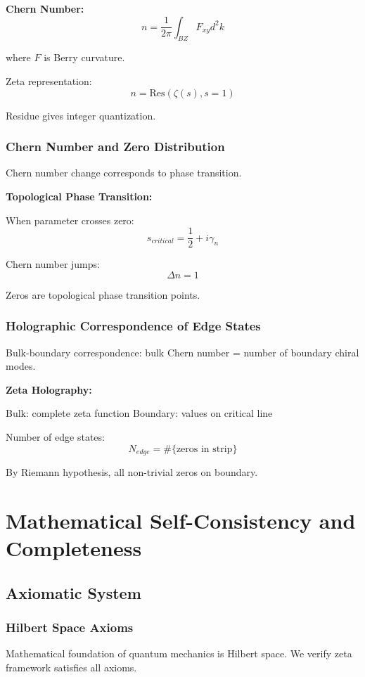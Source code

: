 \documentclass[11pt]{article}
\theoremstyle{plain}
\theoremstyle{definition}
\theoremstyle{remark}
\begin{document}
\textbf{Chern Number:}
$$n = \frac{1}{2\pi} \int_{BZ} F_{xy} d^2k$$

where $F$ is Berry curvature.

Zeta representation:
$$n = \text{Res}(\zeta(s), s = 1)$$

Residue gives integer quantization.

\subsubsection{Chern Number and Zero Distribution}

Chern number change corresponds to phase transition.

\textbf{Topological Phase Transition:}

When parameter crosses zero:
$$s_{critical} = \frac{1}{2} + i\gamma_n$$

Chern number jumps:
$$\Delta n = 1$$

Zeros are topological phase transition points.

\subsubsection{Holographic Correspondence of Edge States}

Bulk-boundary correspondence: bulk Chern number = number of boundary chiral modes.

\textbf{Zeta Holography:}

Bulk: complete zeta function
Boundary: values on critical line

Number of edge states:
$$N_{edge} = \#\{\text{zeros in strip}\}$$

By Riemann hypothesis, all non-trivial zeros on boundary.

\section{Mathematical Self-Consistency and Completeness}

\subsection{Axiomatic System}

\subsubsection{Hilbert Space Axioms}

Mathematical foundation of quantum mechanics is Hilbert space. We verify zeta framework satisfies all axioms.
\end{document}
